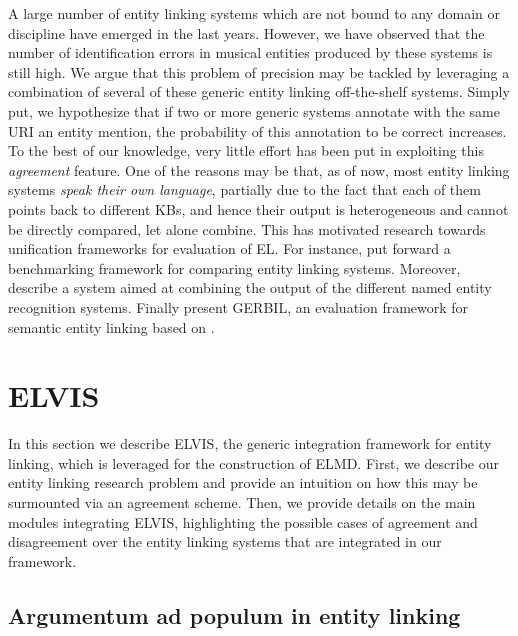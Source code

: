 A large number of entity linking systems which are not bound to any domain or discipline have emerged in the last years. However, we have observed that the number of identification errors in musical entities produced by these systems is still high. We argue that this problem of precision may be tackled by leveraging a combination of several of these generic entity linking off-the-shelf systems. Simply put, we hypothesize that if two or more generic systems annotate with the same URI an entity mention, the probability of this annotation to be correct increases. To the best of our knowledge, very little effort has been put in exploiting this \textit{agreement} feature. One of the reasons may be that, as of now, most entity linking systems \textit{speak their own language}, partially due to the fact that each of them points back to different KBs, and hence their output is heterogeneous and cannot be directly compared, let alone combine. This has motivated research towards unification frameworks for evaluation of EL. For instance, \cite{Cornolti2013} put forward a benchmarking framework for comparing entity linking systems. Moreover, \cite{Rizzo2014} describe a system aimed at combining the output of the different named entity recognition systems. Finally \cite{Usbeck2015} present \textsc{GERBIL}, an evaluation framework for semantic entity linking based on \cite{Cornolti2013}. %



\section{ELVIS}
\label{sec:linking:elvis}

In this section we describe \textsc{ELVIS}, the generic integration framework for entity linking, which is leveraged for the construction of \textsc{ELMD}. First, we describe our entity linking research problem and provide an intuition on how this may be surmounted via an agreement scheme. Then, we provide details on the main modules integrating \textsc{ELVIS}, highlighting the possible cases of agreement and disagreement over the entity linking systems that are integrated in our framework.

\subsection{Argumentum ad populum in entity linking}
\label{sec:linking:agreement}

